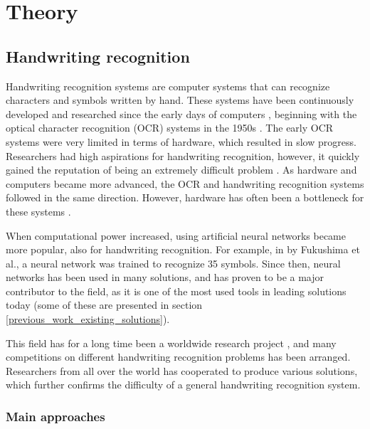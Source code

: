 \chapter{Theory}

\section{Handwriting recognition}
\label{handwriting_recognition}

Handwriting recognition systems are computer systems that can recognize characters and symbols written by hand. These systems have been continuously developed and researched since the early days of computers \cite{simon_off-line_1992}, beginning with the optical character recognition (OCR) systems in the 1950s \cite{mori_historical_1992}. The early OCR systems were very limited in terms of hardware, which resulted in slow progress. Researchers had high aspirations for handwriting recognition, however, it quickly gained the reputation of being an extremely difficult problem \cite{simon_off-line_1992}. As hardware and computers became more advanced, the OCR and handwriting recognition systems followed in the same direction. However, hardware has often been a bottleneck for these systems \cite{mori_historical_1992}.

When computational power increased, using artificial neural networks became more popular, also for handwriting recognition. For example, in \cite{fukushima_handwritten_????} by Fukushima et al., a neural network was trained to recognize 35 symbols. Since then, neural networks has been used in many solutions, and has proven to be a major contributor to the field, as it is one of the most used tools in leading solutions today (some of these are presented in section \ref{previous_work_existing_solutions}).

This field has for a long time been a worldwide research project \cite{mori_historical_1992}, and many competitions on different handwriting recognition problems has been arranged. Researchers from all over the world has cooperated to produce various solutions, which further confirms the difficulty of a general handwriting recognition system. 

\subsection{Main approaches}
\label{main_approaches}

